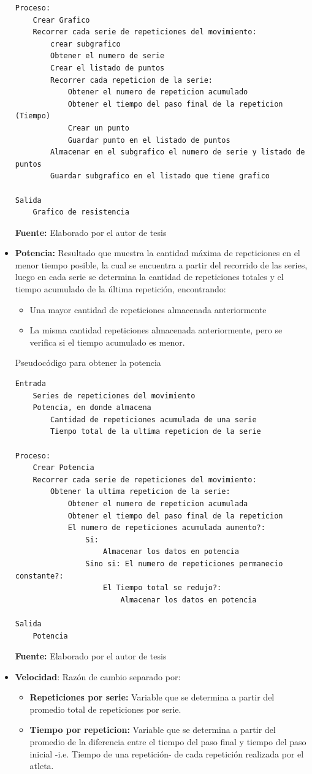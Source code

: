 \begin{itemize}
\begin{code}[H]
\begin{lstlisting}
Proceso:
	Crear Grafico
	Recorrer cada serie de repeticiones del movimiento:
		crear subgrafico
		Obtener el numero de serie
		Crear el listado de puntos
		Recorrer cada repeticion de la serie:
			Obtener el numero de repeticion acumulado 
			Obtener el tiempo del paso final de la repeticion (Tiempo)
			Crear un punto
			Guardar punto en el listado de puntos
		Almacenar en el subgrafico el numero de serie y listado de puntos
		Guardar subgrafico en el listado que tiene grafico

Salida
	Grafico de resistencia
	\end{lstlisting}
	\textbf{Fuente:} Elaborado por el autor de tesis
\end{code} 

\item \textbf{Potencia:} Resultado que muestra la cantidad m\'axima de repeticiones en el menor tiempo posible, la cual se encuentra a partir del recorrido de las series, luego en cada serie se determina la cantidad de repeticiones totales y el tiempo acumulado de la \'ultima repetici\'on, encontrando: 
	\begin{itemize}
	\item Una mayor cantidad de repeticiones almacenada anteriormente
	\item La misma cantidad repeticiones almacenada anteriormente, pero se verifica si el tiempo acumulado es menor.
	\end{itemize}
\begin{code}[H]
	\caption{Pseudoc\'odigo para obtener la potencia}
	\label{code:getEndurance}
	\begin{lstlisting}
Entrada
	Series de repeticiones del movimiento
	Potencia, en donde almacena
		Cantidad de repeticiones acumulada de una serie
		Tiempo total de la ultima repeticion de la serie
		
Proceso:
	Crear Potencia
	Recorrer cada serie de repeticiones del movimiento:
		Obtener la ultima repeticion de la serie:
			Obtener el numero de repeticion acumulada
			Obtener el tiempo del paso final de la repeticion
			El numero de repeticiones acumulada aumento?:
				Si:
					Almacenar los datos en potencia
				Sino si: El numero de repeticiones permanecio constante?:
					El Tiempo total se redujo?:
						Almacenar los datos en potencia
						
Salida
	Potencia 
	\end{lstlisting}
	\textbf{Fuente:} Elaborado por el autor de tesis
\end{code} 

\item \textbf{Velocidad}: Raz\'on de cambio separado por:
	\begin{itemize}
	\item \textbf{Repeticiones por serie:} Variable que se determina a partir del promedio total de repeticiones por serie.
		\item \textbf{Tiempo por repeticion:} Variable que se determina a partir del promedio de la diferencia entre el tiempo del paso final y tiempo del paso inicial -i.e. Tiempo de una repetici\'on- de cada repetici\'on realizada por el atleta.
	\end{itemize}
\end{itemize}


